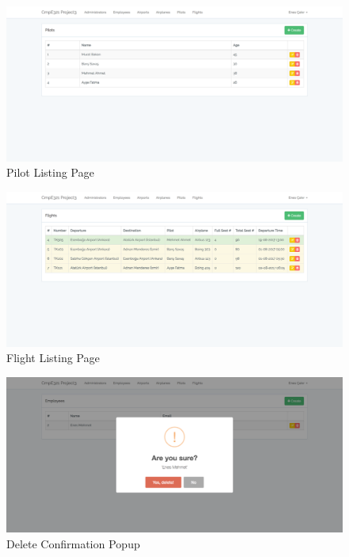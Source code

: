 \documentclass[12pt,a4paper]{article}
\begin{document}
    \begin{figure}[h!]
    \centering
    \includegraphics[width=135mm]{cmpe321_p3_ss3.png}
    \caption{Pilot Listing Page}
    \label{fig:ss3}
    \end{figure}

    \begin{figure}[h!]
    \centering
    \includegraphics[width=135mm]{cmpe321_p3_ss4.png}
    \caption{Flight Listing Page}
    \label{fig:ss4}
    \end{figure}

    \begin{figure}[h!]
    \centering
    \includegraphics[width=135mm]{cmpe321_p3_ss5.png}
    \caption{Delete Confirmation Popup}
    \label{fig:ss5}
    \end{figure}
\end{document}
